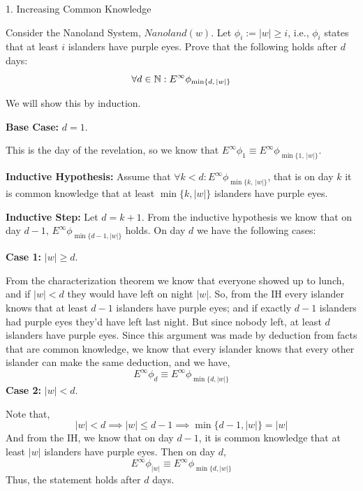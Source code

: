 \documentclass[12pt]{article}
\begin{document}


\begin{problem}{1. Increasing Common Knowledge}

    Consider the Nanoland System, $\textit{Nanoland}(w)$. Let $\phi_i := |w| \geq i$, i.e., $\phi_i$ states that at least $i$ islanders have purple eyes. Prove that the following holds after $d$ days:
    \[\forall d \in \mathbb N: E^\infty \phi_{\min \{d, \,|w|\}} \]
    
\end{problem}

\begin{solution}
    \bbni

    We will show this by induction. 
    
    \textbf{Base Case:} $d = 1$. 

    This is the day of the revelation, so we know that $E^\infty \phi_1 \equiv E^\infty \phi_{\min \{1, \,|w|\}}$. 

    \textbf{Inductive Hypothesis:} Assume that $\forall k < d: E^\infty \phi_{\min \{k, \,|w|\}}$, that is on day $k$ it is common knowledge that at least $\min\{k, |w|\}$ islanders have purple eyes. 

    \textbf{Inductive Step:} Let $d = k + 1$. From the inductive hypothesis we know that on day $d-1$, $E^\infty \phi_{\min\{d-1, |w|\}}$ holds.  On day $d$ we have the following cases: 

    \textbf{Case 1:} $|w| \geq d$. 
    
    From the characterization theorem we know that everyone showed up to lunch, and if $|w| < d$ they would have left on night $|w|$. So, from the IH every islander knows that at least $d-1$ islanders have purple eyes; and if exactly $d-1$ islanders had purple eyes they'd have left last night. But since nobody left, at least $d$ islanders have purple eyes. Since this argument was made by deduction from facts that are common knowledge, we know that every islander knows that every other islander can make the same deduction, and we have,
    \[E^\infty \phi_d \equiv E^\infty \phi_{\min\{d, |w|\}}\]
    \textbf{Case 2:} $|w| < d$. 

    Note that,
    \[|w| < d \implies |w| \leq d-1 \implies \min\{d-1, |w|\} = |w|\]
    And from the IH, we know that on day $d-1$, it is common knowledge that at least $|w|$ islanders have purple eyes. Then on day $d$, 
    \[E^\infty \phi_{|w|} \equiv E^\infty \phi_{\min\{d, |w|\}}\]
    Thus, the statement holds after $d$ days. 
\end{solution}
\newpage
\end{document}
